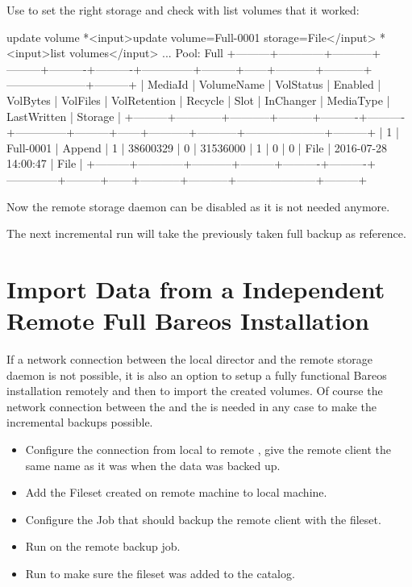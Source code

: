Use  to set the right storage and check with list volumes that it worked:
\begin{bconsole}{update volume}
*<input>update volume=Full-0001 storage=File</input>
*<input>list volumes</input>
...
Pool: Full
+---------+------------+-----------+---------+----------+----------+--------------+---------+------+-----------+-----------+---------------------+---------+
| MediaId | VolumeName | VolStatus | Enabled | VolBytes | VolFiles | VolRetention | Recycle | Slot | InChanger | MediaType | LastWritten         | Storage |
+---------+------------+-----------+---------+----------+----------+--------------+---------+------+-----------+-----------+---------------------+---------+
| 1       | Full-0001  | Append    | 1       | 38600329 | 0        | 31536000     | 1       | 0    | 0         | File      | 2016-07-28 14:00:47 | File    |
+---------+------------+-----------+---------+----------+----------+--------------+---------+------+-----------+-----------+---------------------+---------+
\end{bconsole}

Now the remote storage daemon can be disabled as it is not needed anymore.

The next incremental run will take the previously taken full backup as reference.


\section{Import Data from a Independent Remote Full Bareos Installation}

If a network connection between the local director and the remote storage daemon is not possible, it is also an option to setup a fully functional Bareos installation remotely and then to import the created volumes.
Of course the network connection between the \bareosDir and the \bareosFd is needed in any case to make the incremental backups possible.

\begin{itemize}
    \item Configure the connection from local \bareosDir to remote \bareosFd, give the remote client the same name as it was when the data was backed up.
    \item Add the Fileset created on remote machine to local machine.
    \item Configure the Job that should backup the remote client with the fileset.
    \item Run  on the remote backup job.
    \item Run  to make sure the fileset was added to the catalog.
\end{itemize}


